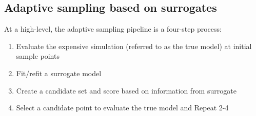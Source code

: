 \subsection{Adaptive sampling based on surrogates}\label{uq:adaptive:surrogate}

At a high-level, the adaptive sampling pipeline is a four-step process:
\begin{enumerate}
\item Evaluate the expensive simulation (referred to as the true model) at
initial sample points
\item Fit/refit a surrogate model
\item Create a candidate set and score based on information from surrogate
\item Select a candidate point to evaluate the true model and Repeat 2-4
\end{enumerate}

